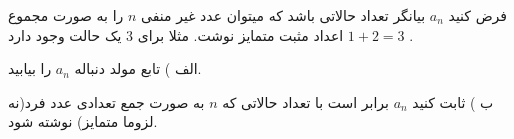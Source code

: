 \exercise
فرض کنید 
$a_n$
بیانگر تعداد حالاتی باشد که میتوان عدد غیر منفی 
$n$
را به صورت مجموع اعداد مثبت متمایز نوشت. مثلا برای 
$3$
 یک حالت وجود دارد 
$1 + 2 = 3$ 
.

الف ) تابع مولد دنباله 
$a_n$
 را بیابید.
 
ب ) ثابت کنید 
$a_n$
 برابر است با تعداد حالاتی که 
$n$
  به صورت جمع تعدادی عدد فرد(نه لزوما متمایز) نوشته شود.